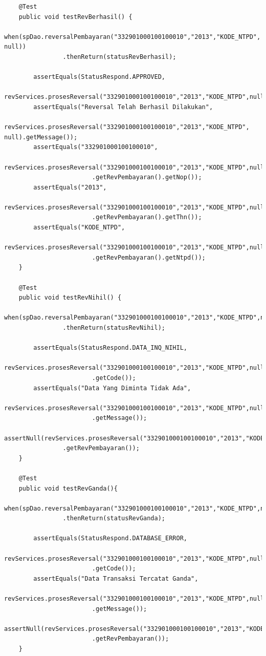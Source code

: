 \documentclass[pdftex,12pt, oneside]{article}
\begin{document}
\begin{enumerate}[A.]
\begin{enumerate}[1.]
\begin{lstlisting}
    @Test
    public void testRevBerhasil() {
        when(spDao.reversalPembayaran("332901000100100010","2013","KODE_NTPD", null))
                .thenReturn(statusRevBerhasil);

        assertEquals(StatusRespond.APPROVED,
                revServices.prosesReversal("332901000100100010","2013","KODE_NTPD",null).getCode());
        assertEquals("Reversal Telah Berhasil Dilakukan",
                revServices.prosesReversal("332901000100100010","2013","KODE_NTPD", null).getMessage());
        assertEquals("332901000100100010",
                revServices.prosesReversal("332901000100100010","2013","KODE_NTPD",null)
                        .getRevPembayaran().getNop());
        assertEquals("2013",
                revServices.prosesReversal("332901000100100010","2013","KODE_NTPD",null)
                        .getRevPembayaran().getThn());
        assertEquals("KODE_NTPD",
                revServices.prosesReversal("332901000100100010","2013","KODE_NTPD",null)
                        .getRevPembayaran().getNtpd());
    }

    @Test
    public void testRevNihil() {
        when(spDao.reversalPembayaran("332901000100100010","2013","KODE_NTPD",null))
                .thenReturn(statusRevNihil);

        assertEquals(StatusRespond.DATA_INQ_NIHIL,
                revServices.prosesReversal("332901000100100010","2013","KODE_NTPD",null)
                        .getCode());
        assertEquals("Data Yang Diminta Tidak Ada",
                revServices.prosesReversal("332901000100100010","2013","KODE_NTPD",null)
                        .getMessage());
        assertNull(revServices.prosesReversal("332901000100100010","2013","KODE_NTPD",null)
                .getRevPembayaran());
    }

    @Test
    public void testRevGanda(){
        when(spDao.reversalPembayaran("332901000100100010","2013","KODE_NTPD",null))
                .thenReturn(statusRevGanda);

        assertEquals(StatusRespond.DATABASE_ERROR,
                revServices.prosesReversal("332901000100100010","2013","KODE_NTPD",null)
                        .getCode());
        assertEquals("Data Transaksi Tercatat Ganda",
                revServices.prosesReversal("332901000100100010","2013","KODE_NTPD",null)
                        .getMessage());
        assertNull(revServices.prosesReversal("332901000100100010","2013","KODE_NTPD",null)
                        .getRevPembayaran());
    }


\end{lstlisting}
\end{enumerate}
\end{enumerate}
\end{document}
